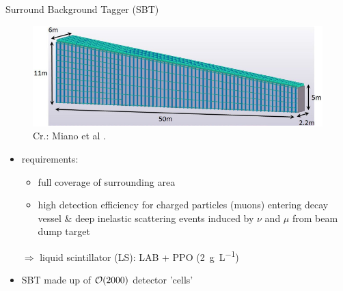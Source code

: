 \documentclass[aspectratio=169]{beamer}
\begin{document}
	
%	
%	
%	
%		



	
	\begin{frame}{Surround Background Tagger (SBT)}
		
		\begin{figure}
			\centering
			\includegraphics[width=.7\textwidth]{pictures/decay_volume.pdf}
			\caption{Cr.: Miano et al \cite{MIANO}.}
		\end{figure}
	\vspace{-.5cm}
		\begin{itemize}
			\item requirements: 
				\begin{itemize}
					\item full coverage of surrounding area
					\item high detection efficiency for charged particles (muons) entering decay vessel \& deep inelastic scattering events induced by $\nu$ and $\mu$ from beam dump target
				\end{itemize}
			$\Rightarrow$ liquid scintillator (LS): LAB + PPO (\SI{2}{\gram\per\liter})
			\item SBT made up of $\order{2000}$ detector 'cells'
			
		\end{itemize}
		
	\end{frame}
	
\end{document}
